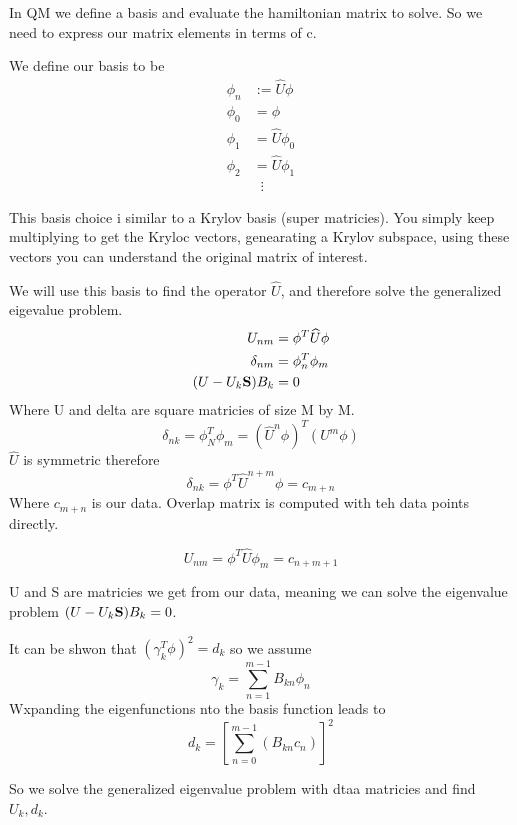 \documentclass{article}
\newcommand{\be}{\begin{equation}}
\newcommand{\ee}{\end{equation}}
\newcommand{\bS}{\mbox{\bf S}}
\begin{document}
In QM we define a basis and evaluate the hamiltonian matrix to solve. 
So we need to express our matrix elements in terms of c. 

We define our basis to be
\be
\begin{split}
    \phi_n &:= \widehat{U}\phi\\
    \phi_0 &= \phi\\
    \phi_1 &= \widehat{U}\phi_0\\
    \phi_2 &= \widehat{U}\phi_1\\
    &\;\;\vdots
\end{split}
\ee

This basis choice i similar to a Krylov basis (super matricies).
You simply keep multiplying to get the Kryloc vectors, genearating a Krylov subspace, using these vectors you can understand the original matrix of interest. 

We will use this basis to find the operator $\widehat{U}$, and therefore solve the generalized eigevalue problem.
\be
\begin{split}
    U_{nm} &= \phi^T\widehat{U}\phi\\
    \delta_{nm} &= \phi^T_n\phi_m\\
    (U-U_k \bS)B_k&= 0
\end{split}
\ee
Where U and delta are square matricies of size M by M.
\be
\delta_{nk} = \phi_N^T\phi_m = (\widehat{U}^n\phi)^T(U^m\phi)
\ee
$\widehat{U}$ is symmetric therefore
\be
\delta_{nk} = \phi^T\widehat{U}^{n+m}\phi = c_{m+n}
\ee
Where $c_{m+n}$ is our data. 
Overlap matrix is computed with teh data points directly. 

\be
U_{nm} = \phi^T\widehat{U}\phi_m = c_{n+m+1}
\ee

U and S are matricies we get from our data, meaning we can solve the eigenvalue problem $(U-U_k \bS)B_k= 0$. 

It can be shwon that $(\gamma_k^T\phi)^2 = d_k$ so we assume
\be
\gamma_k = \sum_{n=1}^{m-1} B_{kn}\phi_n
\ee
Wxpanding the eigenfunctions nto the basis function leads to 
\be
d_k = \left[\sum_{n=0}^{m-1}\left(B_{kn}c_n\right)\right]^2
\ee

So we solve the generalized eigenvalue problem with dtaa matricies and find $U_k, d_k$.
\end{document}
